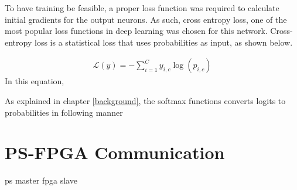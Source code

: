 To have training be feasible, a proper loss function was required to calculate initial gradients for the output neurons. As such, cross entropy loss, one of the most popular loss functions in deep learning was chosen for this network. Cross-entropy loss is a statistical loss that uses probabilities as input, as shown below.



\begin{align}
\mathcal{L}(y) = - \sum_{i = 1}^{C}y_{i,c}\log(p_{i,c})
\end{align}
In this equation, 

As explained in chapter \ref{background}, the softmax functions converts logits to probabilities in following manner

\section{PS-FPGA Communication}\label{az-com}
ps master fpga slave

